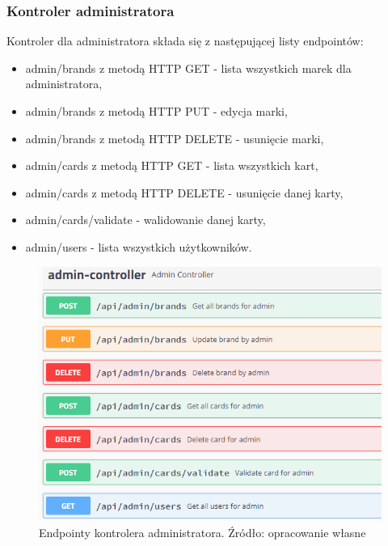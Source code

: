 \subsubsection{Kontroler administratora}
Kontroler dla administratora składa się z następującej listy endpointów:
\begin{itemize}
    \item admin/brands z metodą HTTP GET - lista wszystkich marek dla administratora,
    \item admin/brands z metodą HTTP PUT - edycja marki,
    \item admin/brands z metodą HTTP DELETE - usunięcie marki,
    \item admin/cards z metodą HTTP GET - lista wszystkich kart,
    \item admin/cards z metodą HTTP DELETE - usunięcie danej karty,
    \item admin/cards/validate - walidowanie danej karty,
    \item admin/users - lista wszystkich użytkowników.
\end{itemize}
\begin{figure}[h!]
  \centering
    \includegraphics[width=1.0\textwidth]{images/admin-controller.PNG}
  \caption{Endpointy kontrolera administratora. Źródło: opracowanie własne }
\end{figure}
\FloatBarrier

